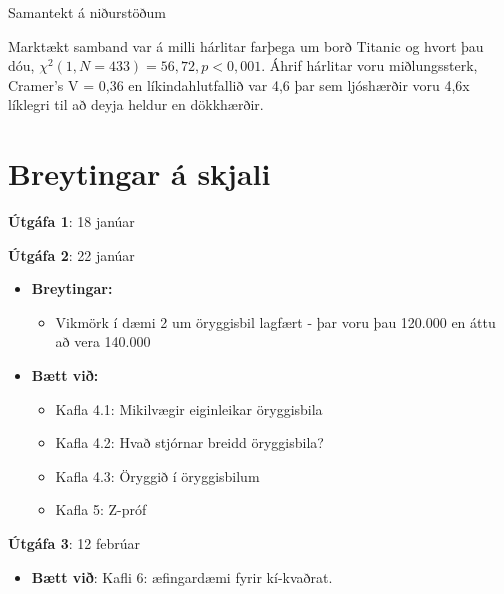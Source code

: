 \documentclass[
]{book}
\providecommand{\tightlist}{%
  \setlength{\itemsep}{0pt}\setlength{\parskip}{0pt}}
\begin{document}
Samantekt á niðurstöðum

Marktækt samband var á milli hárlitar farþega um borð Titanic og hvort þau dóu, \({\chi}^2 (1, N = 433) = 56,72, p < 0,001\). Áhrif hárlitar voru miðlungssterk, Cramer's V = 0,36 en líkindahlutfallið var 4,6 þar sem ljóshærðir voru 4,6x líklegri til að deyja heldur en dökkhærðir.

\hypertarget{breytingar-uxe1-skjali}{%
\chapter{Breytingar á skjali}\label{breytingar-uxe1-skjali}}

\textbf{Útgáfa 1}: 18 janúar

\textbf{Útgáfa 2}: 22 janúar

\begin{itemize}
\item
  \textbf{Breytingar:}

  \begin{itemize}
  \tightlist
  \item
    Vikmörk í dæmi 2 um öryggisbil lagfært - þar voru þau 120.000 en áttu að vera 140.000
  \end{itemize}
\item
  \textbf{Bætt við:}

  \begin{itemize}
  \item
    Kafla 4.1: Mikilvægir eiginleikar öryggisbila
  \item
    Kafla 4.2: Hvað stjórnar breidd öryggisbila?
  \item
    Kafla 4.3: Öryggið í öryggisbilum
  \item
    Kafla 5: Z-próf
  \end{itemize}
\end{itemize}

\textbf{Útgáfa 3}: 12 febrúar

\begin{itemize}
\tightlist
\item
  \textbf{Bætt við}: Kafli 6: æfingardæmi fyrir kí-kvaðrat.
\end{itemize}

  
\end{document}
